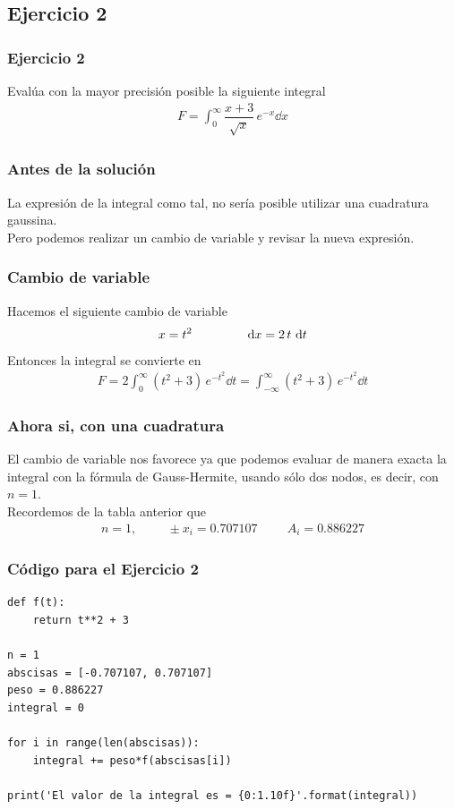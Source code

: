 \subsection*{Ejercicio 2}
\begin{frame}
\frametitle{Ejercicio 2}
Evalúa con la mayor precisión posible la siguiente integral
\begin{align*}
F = \int_{0}^{\infty} \dfrac{x + 3}{\sqrt{x}} \, e^{-x} \dd{x}
\end{align*}
\end{frame}
\begin{frame}
\frametitle{Antes de la solución}
La expresión de la integral como tal, no sería posible utilizar una cuadratura gaussina.
\\
\bigskip
\pause
Pero podemos realizar un cambio de variable y revisar la nueva expresión.
\end{frame}
\begin{frame}
\frametitle{Cambio de variable}
Hacemos el siguiente cambio de variable
\begin{align*}
x = t^{2} \hspace{1.5cm} \dd{x} = 2 \, t \, \dd{t}
\end{align*}
\pause
Entonces la integral se convierte en
\begin{align*}
F = 2 \int_{0}^{\infty} (t^{2} + 3) \, e^{-t^{2}} \dd{t} = \int_{-\infty}^{\infty} (t^{2} + 3) \, e^{-t^{2}} \dd{t}
\end{align*}
\end{frame}
\begin{frame}
\frametitle{Ahora si, con una cuadratura}
El cambio de variable nos favorece ya que podemos evaluar de manera exacta la integral con la fórmula de Gauss-Hermite, usando sólo dos nodos, es decir, con $n=1$.
\\
\bigskip
\pause
Recordemos de la tabla anterior que
\begin{align*}
n = 1, \hspace{1cm} \pm x_{i} = 0.707107 \hspace{1cm} A_{i} = 0.886227
\end{align*}
\end{frame}
\begin{frame}
\frametitle{Código para el Ejercicio 2}
\begin{lstlisting}[caption=Código para la fórmula Gauss-Hermite, style=FormattedNumber, basicstyle=\linespread{1.1}\ttfamily=\tiny, columns=fullflexible]
def f(t):
    return t**2 + 3

n = 1
abscisas = [-0.707107, 0.707107]
peso = 0.886227
integral = 0

for i in range(len(abscisas)):
    integral += peso*f(abscisas[i])

print('El valor de la integral es = {0:1.10f}'.format(integral))
\end{lstlisting}
\end{frame}
